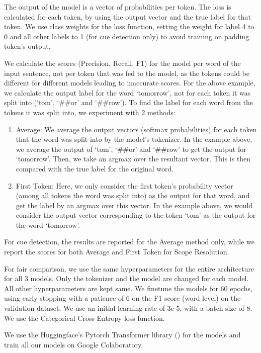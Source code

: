 \documentclass[runningheads]{llncs}
\begin{document}
\noindent
The output of the model is a vector of probabilities per token. The loss is calculated for each token, by using the output vector and the true label for that token. We use class weights for the loss function, setting the weight for label 4 to 0 and all other labels to 1 (for cue detection only) to avoid training on padding token’s output.

\noindent \par We calculate the scores (Precision, Recall, F1) for the model per word of the input sentence, not per token that was fed to the model, as the tokens could be different for different models leading to inaccurate scores. For the above example, we calculate the output label for the word ‘tomorrow', not for each token it was split into (‘tom', ‘\#\#or' and ‘\#\#row'). To find the label for each word from the tokens it was split into, we experiment with 2 methods:
\begin{enumerate}
    \item Average: We average the output vectors (softmax probabilities) for each token that the word was split into by the model's tokenizer. In the example above, we average the output of ‘tom', ‘\#\#or' and ‘\#\#row' to get the output for ‘tomorrow'. Then, we take an argmax over the resultant vector. This is then compared with the true label for the original word.
    
    \item First Token: Here, we only consider the first token's probability vector (among all tokens the word was split into) as the output for that word, and get the label by an argmax over this vector. In the example above, we would consider the output vector corresponding to the token ‘tom' as the output for the word ‘tomorrow'. 
\end{enumerate}
\par For cue detection, the results are reported for the Average method only, while we report the scores for both Average and First Token for Scope Resolution.
\noindent
\par For fair comparison, we use the same hyperparameters for the entire architecture for all 3 models. Only the tokenizer and the model are changed for each model. All other hyperparameters are kept same. We finetune the models for 60 epochs, using early stopping with a patience of 6 on the F1 score (word level) on the validation dataset. We use an initial learning rate of 3e-5, with a batch size of 8. We use the Categorical Cross Entropy loss function. \par
We use the Huggingface’s Pytorch Transformer library (\cite{Wolf2019HuggingFacesTS}) for the models and train all our models on Google Colaboratory.
\end{document}
